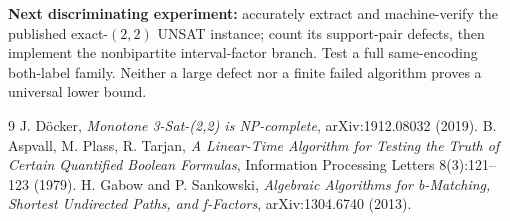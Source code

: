 \documentclass[10pt]{article}
\begin{document}
\textbf{Next discriminating experiment:} accurately extract and machine-verify the published exact-$(2,2)$ UNSAT instance; count its support-pair defects, then implement the nonbipartite interval-factor branch. Test a full same-encoding both-label family. Neither a large defect nor a finite failed algorithm proves a universal lower bound.

\begin{thebibliography}{9}
 J. D\"ocker, \emph{Monotone 3-Sat-(2,2) is NP-complete}, arXiv:1912.08032 (2019).
 B. Aspvall, M. Plass, R. Tarjan, \emph{A Linear-Time Algorithm for Testing the Truth of Certain Quantified Boolean Formulas}, Information Processing Letters 8(3):121--123 (1979).
 H. Gabow and P. Sankowski, \emph{Algebraic Algorithms for b-Matching, Shortest Undirected Paths, and f-Factors}, arXiv:1304.6740 (2013).
\end{thebibliography}
\end{document}
